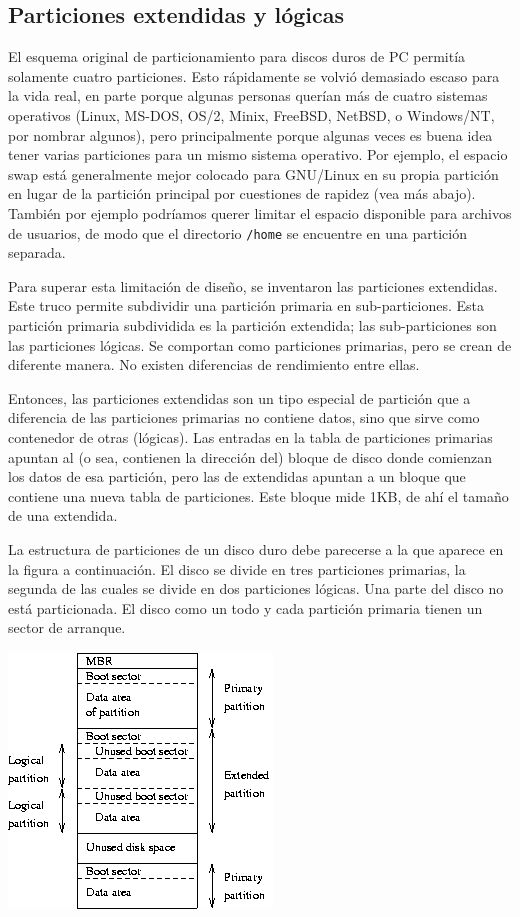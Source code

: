 \documentclass[12pt]{article}
\begin{document}
\subsection*{Particiones extendidas y lógicas}

El esquema original de particionamiento para discos duros de PC permitía 
solamente cuatro particiones. Esto rápidamente se volvió demasiado escaso 
para la vida real, en parte porque algunas personas querían más de cuatro 
sistemas operativos (Linux, MS-DOS, OS/2, Minix, FreeBSD, NetBSD, o 
Windows/NT, por nombrar algunos), pero principalmente 
porque algunas veces es buena idea tener varias particiones para un mismo 
sistema operativo. Por ejemplo, el espacio swap está generalmente mejor 
colocado para GNU/Linux en su propia partición en lugar de la partición 
principal por cuestiones de rapidez (vea más abajo). También por ejemplo 
podríamos querer limitar el espacio disponible 
para archivos de usuarios, de modo que el directorio \texttt{/home} se 
encuentre en una partición separada. 

Para superar esta limitación de diseño, se inventaron las particiones 
extendidas. Este truco permite subdividir una partición primaria en 
sub-particiones. Esta partición primaria subdividida es la partición 
extendida; las sub-particiones son las particiones lógicas. Se comportan 
como particiones primarias, pero se crean de diferente manera. No existen
diferencias de rendimiento entre ellas.

Entonces, las particiones extendidas son un tipo especial de partición 
que a diferencia de las particiones primarias no contiene datos, sino que 
sirve como contenedor de otras (lógicas). Las entradas en la tabla de 
particiones primarias apuntan al (o sea, contienen la dirección del) bloque 
de disco donde comienzan los datos de esa partición, pero las de extendidas 
apuntan a un bloque que contiene una nueva tabla de particiones. 
Este bloque mide 1KB, de ahí el tamaño de una extendida.

La estructura de particiones de un disco duro debe parecerse a la que 
aparece en la figura a continuación. El disco se divide en tres particiones 
primarias, la segunda de las cuales se divide en dos 
particiones lógicas. Una parte del disco no está particionada. El disco 
como un todo y cada partición primaria tienen un sector de arranque.

\begin{center}
 \includegraphics{hd-layout.png}
\end{center}
\end{document}

